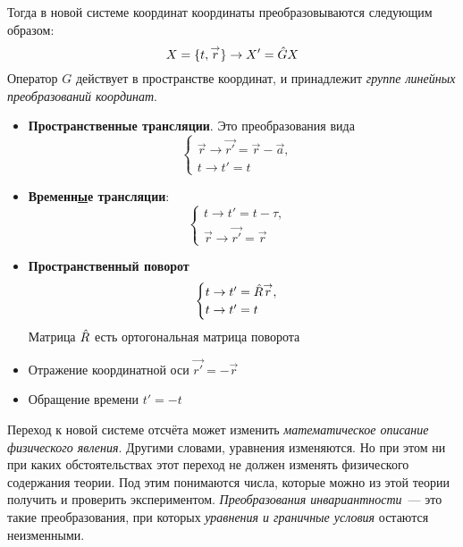 Тогда в новой системе координат координаты преобразовываются следующим образом:
$$
    X = \{t, \vec r\} \to X ' = \Hat G X
$$
Оператор $G$ действует в пространстве координат, и принадлежит \emph{группе линейных преобразований координат}.

\begin{itemize}
  \item \textbf{Пространственные трансляции}. Это преобразования вида
  $$
  \begin{cases}
    \vec r \to \vec {r'} = \vec r -  \vec a, &\\
    t \to t' = t &
  \end{cases}
  $$
  \item \textbf{Временн\underline{ы}е трансляции}:
  $$
    \begin{cases}
        t \to t' = t - \tau, & \\
        \vec r \to \vec {r'} = \vec r &
    \end{cases}
  $$
  \item \textbf{Пространственный поворот}
  $$
    \begin{cases}
        t \to t' = \Hat R \vec r, &\\
        t \to t' = t&
    \end{cases}  
  $$
  Матрица $\Hat R$ есть ортогональная матрица поворота
  \item Отражение координатной оси $\vec{r'} = -\vec r$
  \item Обращение времени $t' = -t$
\end{itemize}
\Rem Переход к новой системе отсчёта может изменить \emph{математическое описание физического явления}.
Другими словами, уравнения изменяются. Но при этом ни при каких обстоятельствах этот переход не должен изменять физического содержания теории. Под этим понимаются числа, которые можно из этой теории получить и проверить экспериментом. 
\pagebreak[3]
\Def \emph{Преобразования инвариантности}~--- это такие преобразования, при которых \emph{уравнения и граничные условия} остаются неизменными.

